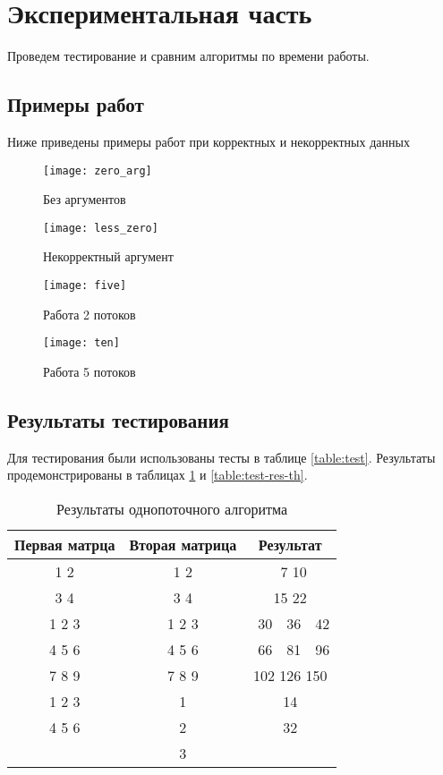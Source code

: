 \newpage
\section{Экспериментальная часть}

Проведем тестирование и сравним алгоритмы по времени работы.

\subsection{Примеры работ}

Ниже приведены примеры работ при корректных и некорректных данных

\begin{figure}[H]
    \centering
    \texttt{[image: zero\_arg]}
    \caption{Без аргументов}
    \label{img:zero-arg}
\end{figure}

\begin{figure}[H]
    \centering
    \texttt{[image: less\_zero]}
    \caption{Некорректный аргумент}
    \label{img:less-arg}
\end{figure}

\begin{figure}[H]
    \centering
    \texttt{[image: five]}
    \caption{Работа 2 потоков}
    \label{img:five}
\end{figure}

\begin{figure}[H]
    \centering
    \texttt{[image: ten]}
    \caption{Работа 5 потоков}
    \label{img:ten}
\end{figure}

\subsection{Результаты тестирования}

Для тестирования были использованы тесты в таблице \ref{table:test}.
Результаты продемонстрированы в таблицах \ref{table:test-res} и \ref{table:test-res-th}.

\begin{table}[H]
    \caption{Результаты однопоточного алгоритма}
    \label{table:test-res}
    \centering
    \begin{tabular}{|c|c|c|}
        \hline
        Первая матрца & Вторая матрица & Результат \\
        \hline
        1 2 & 1 2 & \ 7 10 \\
        3 4 & 3 4 & 15 22 \\
        \hline
        1 2 3 & 1 2 3 & \ 30\ \ 36\ \ 42 \\
        4 5 6 & 4 5 6 & \ 66\ \ 81\ \ 96 \\
        7 8 9 & 7 8 9 & 102 126 150 \\
        \hline
        1 2 3 & 1 & 14 \\
        4 5 6 & 2 & 32 \\
              & 3 & \\
        \hline
    \end{tabular}
\end{table}

